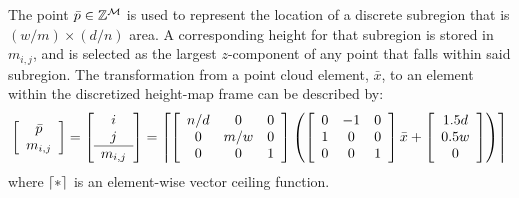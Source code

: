 			The point $\bar{p}\in{\Bbb Z}^{{\cal M}}$ is used to represent the location of a discrete subregion that is $(w/m) \times (d/n)$ area. A corresponding height for that subregion is stored in $m_{i,j}$, and is selected as the largest $z$-component of any point that falls within said subregion. The transformation from a point cloud element, $\bar{x}$, to an element within the discretized height-map frame can be described by:
				\begin{equation}
					\left[
						\begin{array}{c}
						\bar{p} \\
						m_{i,j}  	\\
						\end{array}
					\right]
					=
					\left[
						\begin{array}{c}
						i \\
						j \\ \hline
						m_{i,j}  	\\
						\end{array}
					\right]
					=
					\left\lceil
						\left[
							\begin{array}{ccc}
							n/d & 0 	& 0 \\
							0 	& m/w 	& 0 \\
							0 	& 0 	& 1 \\
							\end{array}
						\right]
						\left(
							\left[
								\begin{array}{ccc}
								0 &-1 & 0 \\
								1 & 0 & 0 \\
								0 & 0 & 1 \\
								\end{array}
							\right]
							\bar{x}
							+
							\left[
								\begin{array}{c}
								1.5 d \\
								0.5 w \\
								0 \\
								\end{array}
							\right]
						\right)
					\right\rceil
					\label{eq::toheightmapframe}
				\end{equation}
			where $\left\lceil*\right\rceil$ is an element-wise vector ceiling function.

